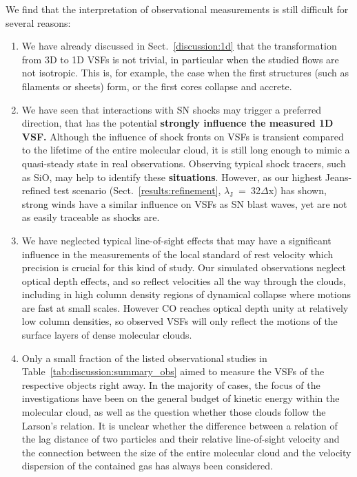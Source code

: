We find that the interpretation of observational measurements is still difficult for several reasons:
\begin{enumerate}
\item We have already discussed in Sect.~\ref{discussion:1d} that the transformation from 3D to 1D VSFs is not trivial, in particular when the studied flows are not isotropic.
This is, for example, the case when the first structures (such as filaments or sheets) form, or the first cores collapse and accrete.
\item We have seen that interactions with SN shocks may trigger a preferred direction, that has the potential \textbf{strongly influence the measured 1D VSF.}
Although the influence of shock fronts on VSFs is transient compared to the lifetime of the entire molecular cloud, it is still long enough to mimic a quasi-steady state in real observations.
Observing typical shock tracers, such as SiO, may help to identify these \textbf{situations}. 
However, as our highest Jeans-refined test scenario (Sect.~\ref{results:refinement}, $\lambda_\mathrm{J}$~=~32$\Delta$x) has shown, strong winds have a similar influence on VSFs as SN blast waves, yet are not as easily traceable as shocks are. 
\item 
{}
We have neglected typical line-of-sight effects that may have a significant influence in the measurements of the local standard of rest velocity which precision is crucial for this kind of study.
      Our simulated observations neglect optical depth effects, and so reflect velocities all the way through the clouds, including in high column density regions of dynamical collapse where motions are fast at small scales.  However CO reaches optical depth unity at relatively low column densities, so observed VSFs will only reflect the motions of the surface layers of dense molecular clouds.  
\item Only a small fraction of the listed observational studies in Table~\ref{tab:discussion:summary_obs} aimed to measure the VSFs of the respective objects right away.
In the majority of cases, the focus of the investigations have been on the general budget of kinetic energy within the molecular cloud, as well as the question whether those clouds follow the Larson's relation.
It is unclear whether the difference between a relation of the lag distance of two particles and their relative line-of-sight velocity and the connection between the size of the entire molecular cloud and the velocity dispersion of the contained gas has always been considered.
\end{enumerate}

